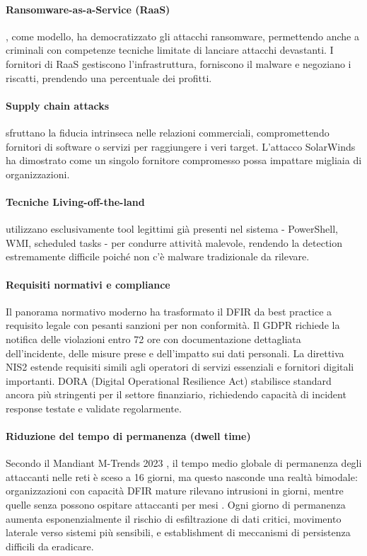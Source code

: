 \paragraph{Ransomware-as-a-Service (RaaS)}, come modello, ha democratizzato gli attacchi ransomware, permettendo anche a criminali con competenze tecniche limitate di lanciare attacchi devastanti. I fornitori di RaaS gestiscono l'infrastruttura, forniscono il malware e negoziano i riscatti, prendendo una percentuale dei profitti.

\paragraph{Supply chain attacks} sfruttano la fiducia intrinseca nelle relazioni commerciali, compromettendo fornitori di software o servizi per raggiungere i veri target. L'attacco SolarWinds \cite{solarwinds2020} ha dimostrato come un singolo fornitore compromesso possa impattare migliaia di organizzazioni.

\paragraph{Tecniche Living-off-the-land} utilizzano esclusivamente tool legittimi già presenti nel sistema - PowerShell, WMI, scheduled tasks - per condurre attività malevole, rendendo la detection estremamente difficile poiché non c'è malware tradizionale da rilevare.

\paragraph{Requisiti normativi e compliance}
Il panorama normativo moderno ha trasformato il DFIR da best practice a requisito legale con pesanti sanzioni per non conformità. Il GDPR \cite{gdpr2016} richiede la notifica delle violazioni entro 72 ore con documentazione dettagliata dell'incidente, delle misure prese e dell'impatto sui dati personali. La direttiva NIS2 \cite{nis2_2022} estende requisiti simili agli operatori di servizi essenziali e fornitori digitali importanti. DORA (Digital Operational Resilience Act) \cite{dora2022} stabilisce standard ancora più stringenti per il settore finanziario, richiedendo capacità di incident response testate e validate regolarmente.

\paragraph{Riduzione del tempo di permanenza (dwell time)}
Secondo il Mandiant M-Trends 2023 \cite{mandiant2023}, il tempo medio globale di permanenza degli attaccanti nelle reti è sceso a 16 giorni, ma questo nasconde una realtà bimodale: organizzazioni con capacità DFIR mature rilevano intrusioni in giorni, mentre quelle senza possono ospitare attaccanti per mesi . Ogni giorno di permanenza aumenta esponenzialmente il rischio di esfiltrazione di dati critici, movimento laterale verso sistemi più sensibili, e establishment di meccanismi di persistenza difficili da eradicare.


